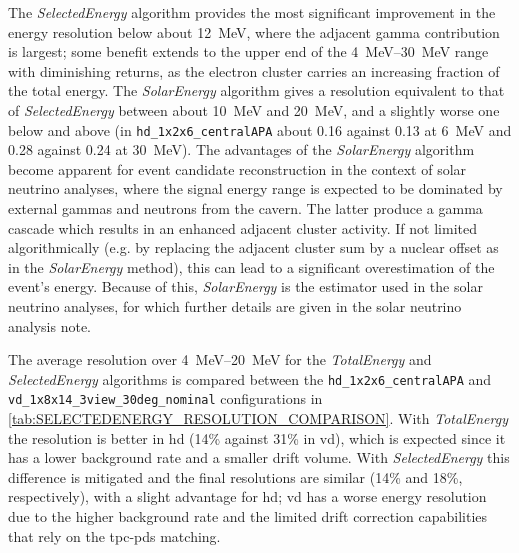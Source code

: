 The \emph{SelectedEnergy} algorithm provides the most significant improvement in the energy resolution below about \SI{12}{\mega\electronvolt}, where the adjacent gamma contribution is largest; some benefit extends to the upper end of the \qtyrange{4}{30}{\mega\electronvolt} range with diminishing returns, as the electron cluster carries an increasing fraction of the total energy. The \emph{SolarEnergy} algorithm gives a resolution equivalent to that of \emph{SelectedEnergy} between about \SI{10}{\mega\electronvolt} and \SI{20}{\mega\electronvolt}, and a slightly worse one below and above (in \texttt{hd\_1x2x6\_centralAPA} about \num{0.16} against \num{0.13} at \SI{6}{\mega\electronvolt} and \num{0.28} against \num{0.24} at \SI{30}{\mega\electronvolt}). The advantages of the \emph{SolarEnergy} algorithm become apparent for event candidate reconstruction in the context of solar neutrino analyses, where the signal energy range is expected to be dominated by external gammas and neutrons from the cavern. The latter produce a gamma cascade which results in an enhanced adjacent cluster activity. If not limited algorithmically (e.g. by replacing the adjacent cluster sum by a nuclear offset as in the \emph{SolarEnergy} method), this can lead to a significant overestimation of the event's energy. Because of this, \emph{SolarEnergy} is the estimator used in the solar neutrino analyses, for which further details are given in the solar neutrino analysis note.

The average resolution over \qtyrange{4}{20}{\mega\electronvolt} for the \emph{TotalEnergy} and \emph{SelectedEnergy} algorithms is compared between the \texttt{hd\_1x2x6\_centralAPA} and \texttt{vd\_1x8x14\_3view\_30deg\_nominal} configurations in \cref{tab:SELECTEDENERGY_RESOLUTION_COMPARISON}. With \emph{TotalEnergy} the resolution is better in \gls{hd} (\num{14}\% against \num{31}\% in \gls{vd}), which is expected since it has a lower background rate and a smaller drift volume. With \emph{SelectedEnergy} this difference is mitigated and the final resolutions are similar (\num{14}\% and \num{18}\%, respectively), with a slight advantage for \gls{hd}; \gls{vd} has a worse energy resolution due to the higher background rate and the limited drift correction capabilities that rely on the \gls{tpc}-\gls{pds} matching.

\begin{table}[ht!]
    \centering
    
    \caption{Average neutrino energy resolution over \qtyrange{4}{20}{\mega\electronvolt} compared between geometries, applying the \emph{TotalEnergy} and \emph{SelectedEnergy} reconstruction algorithms.\label{tab:SELECTEDENERGY_RESOLUTION_COMPARISON}}
\end{table}

